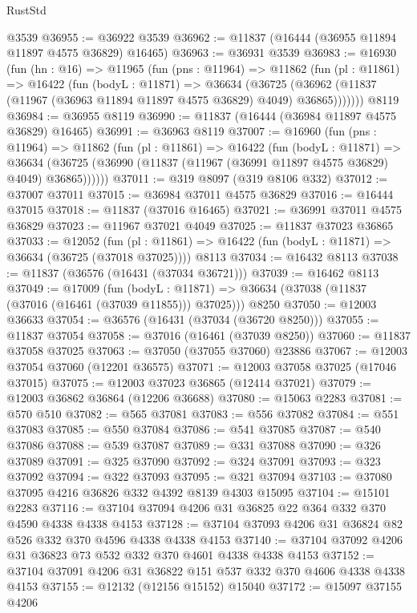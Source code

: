 \begin{lexlean}{RustStd}
\begin{coremodule}
    @3539
@36955 := @36922 @3539
@36962 := @11837 (@16444 (@36955 @11894 @11897 @4575 @36829) @16465)
@36963 := @36931 @3539
@36983 := @16930
    (fun (hn : @16) =>
    @11965
      (fun (pns : @11964) =>
      @11862
        (fun (pl : @11861) =>
        @16422
          (fun (bodyL : @11871) =>
          @36634
            (@36725 (@36962 (@11837 (@11967 (@36963 @11894 @11897 @4575 @36829) @4049) @36865)))))))
    @8119
@36984 := @36955 @8119
@36990 := @11837 (@16444 (@36984 @11897 @4575 @36829) @16465)
@36991 := @36963 @8119
@37007 := @16960
    (fun (pns : @11964) =>
    @11862
      (fun (pl : @11861) =>
      @16422
        (fun (bodyL : @11871) =>
        @36634 (@36725 (@36990 (@11837 (@11967 (@36991 @11897 @4575 @36829) @4049) @36865))))))
@37011 := @319 @8097 (@319 @8106 @332)
@37012 := @37007 @37011
@37015 := @36984 @37011 @4575 @36829
@37016 := @16444 @37015
@37018 := @11837 (@37016 @16465)
@37021 := @36991 @37011 @4575 @36829
@37023 := @11967 @37021 @4049
@37025 := @11837 @37023 @36865
@37033 := @12052
    (fun (pl : @11861) => @16422 (fun (bodyL : @11871) => @36634 (@36725 (@37018 @37025))))
    @8113
@37034 := @16432 @8113
@37038 := @11837 (@36576 (@16431 (@37034 @36721)))
@37039 := @16462 @8113
@37049 := @17009
    (fun (bodyL : @11871) => @36634 (@37038 (@11837 (@37016 (@16461 (@37039 @11855))) @37025)))
    @8250
@37050 := @12003 @36633
@37054 := @36576 (@16431 (@37034 (@36720 @8250)))
@37055 := @11837 @37054
@37058 := @37016 (@16461 (@37039 @8250))
@37060 := @11837 @37058 @37025
@37063 := @37050 (@37055 @37060) @23886
@37067 := @12003 @37054 @37060 (@12201 @36575)
@37071 := @12003 @37058 @37025 (@17046 @37015)
@37075 := @12003 @37023 @36865 (@12414 @37021)
@37079 := @12003 @36862 @36864 (@12206 @36688)
@37080 := @15063 @2283
@37081 := @570 @510
@37082 := @565 @37081
@37083 := @556 @37082
@37084 := @551 @37083
@37085 := @550 @37084
@37086 := @541 @37085
@37087 := @540 @37086
@37088 := @539 @37087
@37089 := @331 @37088
@37090 := @326 @37089
@37091 := @325 @37090
@37092 := @324 @37091
@37093 := @323 @37092
@37094 := @322 @37093
@37095 := @321 @37094
@37103 := @37080 @37095 @4216 @36826 @332 @4392 @8139 @4303 @15095
@37104 := @15101 @2283
@37116 := @37104 @37094 @4206 @31 @36825 @22 @364 @332 @370 @4590 @4338 @4338 @4153
@37128 := @37104 @37093 @4206 @31 @36824 @82 @526 @332 @370 @4596 @4338 @4338 @4153
@37140 := @37104 @37092 @4206 @31 @36823 @73 @532 @332 @370 @4601 @4338 @4338 @4153
@37152 := @37104 @37091 @4206 @31 @36822 @151 @537 @332 @370 @4606 @4338 @4338 @4153
@37155 := @12132 (@12156 @15152) @15040
@37172 := @15097
    @37155
    @4206

\end{coremodule}
\end{lexlean}
